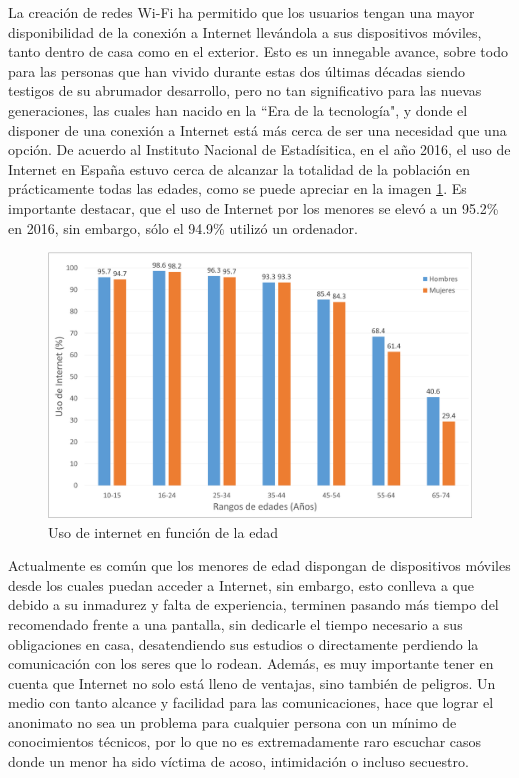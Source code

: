 \documentclass[12pt]{article}
\begin{document}
La creación de redes Wi-Fi ha permitido que los usuarios tengan una mayor disponibilidad de la conexión a Internet llevándola a sus dispositivos móviles, tanto dentro de casa como en el exterior. Esto es un innegable avance, sobre todo para las personas que han vivido durante estas dos últimas décadas siendo testigos de su abrumador desarrollo, pero no tan significativo para las nuevas generaciones, las cuales han nacido en la ``Era de la tecnología", y donde el disponer de una conexión a Internet está más cerca de ser una necesidad que una opción. De acuerdo al Instituto Nacional de Estadísitica, en el año 2016, el uso de Internet en España estuvo cerca de alcanzar la totalidad de la población en prácticamente todas las edades, como se puede apreciar en la imagen \ref{fig:internet_ages}. Es importante destacar, que el uso de Internet por los menores se elevó a un 95.2\% en 2016, sin embargo, sólo el 94.9\% utilizó un ordenador.

\begin{figure}[h!]
    \centering
        \includegraphics[scale=0.5]{internet_ages.eps}
        \caption*{Uso de internet en función de la edad}
        \label{fig:internet_ages}
\end{figure}

Actualmente es común que los menores de edad dispongan de dispositivos móviles desde los cuales puedan acceder a Internet, sin embargo, esto conlleva a que debido a su inmadurez y falta de experiencia, terminen pasando más tiempo del recomendado frente a una pantalla, sin dedicarle el tiempo necesario a sus obligaciones en casa, desatendiendo sus estudios o directamente perdiendo la comunicación con los seres que lo rodean. Además, es muy importante tener en cuenta que Internet no solo está lleno de ventajas, sino también de peligros. Un medio con tanto alcance y facilidad para las comunicaciones, hace que lograr el anonimato no sea un problema para cualquier persona con un mínimo de conocimientos técnicos, por lo que no es extremadamente raro escuchar casos donde un menor ha sido víctima de acoso, intimidación o incluso secuestro.
\end{document}
